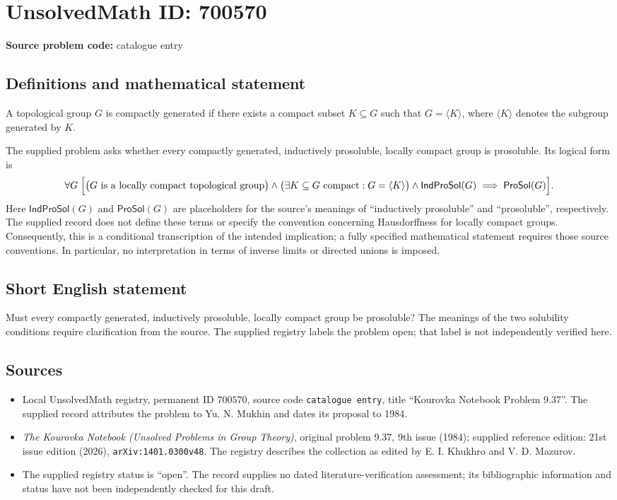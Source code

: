\documentclass[11pt]{article}
\begin{document}
\section*{UnsolvedMath ID: 700570}
\textbf{Source problem code:} catalogue entry
\subsection{Definitions and mathematical statement}
A topological group \(G\) is compactly generated if there exists a compact subset \(K\subseteq G\) such that \(G=\langle K\rangle\), where \(\langle K\rangle\) denotes the subgroup generated by \(K\).

The supplied problem asks whether every compactly generated, inductively prosoluble, locally compact group is prosoluble. Its logical form is
\[
\forall G\;\Bigl[\bigl(G\text{ is a locally compact topological group}\bigr)\land\bigl(\exists K\subseteq G\text{ compact}:G=\langle K\rangle\bigr)\land\mathsf{IndProSol}(G)\;\Longrightarrow\;\mathsf{ProSol}(G)\Bigr].
\]
Here \(\mathsf{IndProSol}(G)\) and \(\mathsf{ProSol}(G)\) are placeholders for the source's meanings of ``inductively prosoluble'' and ``prosoluble'', respectively. The supplied record does not define these terms or specify the convention concerning Hausdorffness for locally compact groups. Consequently, this is a conditional transcription of the intended implication; a fully specified mathematical statement requires those source conventions. In particular, no interpretation in terms of inverse limits or directed unions is imposed.
\subsection{Short English statement}
Must every compactly generated, inductively prosoluble, locally compact group be prosoluble? The meanings of the two solubility conditions require clarification from the source. The supplied registry labels the problem open; that label is not independently verified here.
\subsection{Sources}
\begin{itemize}
\item Local UnsolvedMath registry, permanent ID \(700570\), source code \texttt{catalogue entry}, title ``Kourovka Notebook Problem 9.37''. The supplied record attributes the problem to Yu. N. Mukhin and dates its proposal to 1984.
\item \emph{The Kourovka Notebook (Unsolved Problems in Group Theory)}, original problem 9.37, 9th issue (1984); supplied reference edition: 21st issue edition (2026), \texttt{arXiv:1401.0300v48}. The registry describes the collection as edited by E. I. Khukhro and V. D. Mazurov.
\item The supplied registry status is ``open''. The record supplies no dated literature-verification assessment; its bibliographic information and status have not been independently checked for this draft.
\end{itemize}
\end{document}
